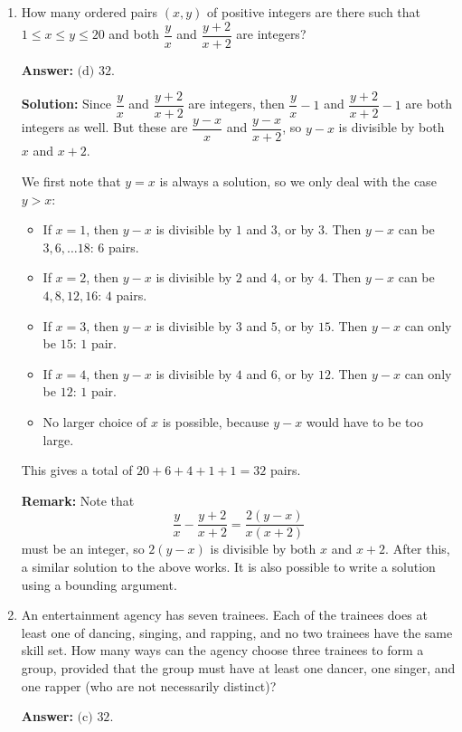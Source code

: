 \documentclass[11pt,paper=letter]{scrartcl}
\begin{document}
\begin{enumerate}[left=0pt]
\item How many ordered pairs $(x, y)$ of positive integers are there such that $1 \leq x \leq y \leq 20$ and both $\dfrac yx$ and $\dfrac{y+2}{x+2}$ are integers?


\textbf{Answer:} $\boxed{\text{(d) }32}$.

\textbf{Solution:} Since $\dfrac yx$ and $\dfrac{y+2}{x+2}$ are integers, then $\dfrac yx - 1$ and $\dfrac{y+2}{x+2} - 1$ are both integers as well. But these are $\dfrac{y-x}x$ and $\dfrac{y-x}{x+2}$, so $y-x$ is divisible by both $x$ and $x+2$.

We first note that $y = x$ is always a solution, so we only deal with the case $y > x$:
\begin{itemize}
  \item If $x = 1$, then $y-x$ is divisible by $1$ and $3$, or by $3$. Then $y-x$ can be $3, 6, \ldots 18$: $6$ pairs.
  \item If $x = 2$, then $y-x$ is divisible by $2$ and $4$, or by $4$. Then $y-x$ can be $4, 8, 12, 16$: $4$ pairs.
  \item If $x = 3$, then $y-x$ is divisible by $3$ and $5$, or by $15$. Then $y-x$ can only be $15$: $1$ pair.
  \item If $x = 4$, then $y-x$ is divisible by $4$ and $6$, or by $12$. Then $y-x$ can only be $12$: $1$ pair.
  \item No larger choice of $x$ is possible, because $y-x$ would have to be too large.
\end{itemize}
This gives a total of $20 + 6 + 4 + 1 + 1 = 32$ pairs.

\textbf{Remark:} Note that $$\dfrac yx - \dfrac{y+2}{x+2}= \dfrac{2(y-x)}{x(x+2)}$$ must be an integer, so $2(y-x)$ is divisible by both $x$ and $x+2$. After this, a similar solution to the above works. It is also possible to write a solution using a bounding argument. 

\item An entertainment agency has seven trainees. Each of the trainees does at least one of dancing, singing, and rapping, and no two trainees have the same skill set. How many ways can the agency choose three trainees to form a group, provided that the group must have at least one dancer, one singer, and one rapper (who are not necessarily distinct)?


\textbf{Answer:} $\boxed{\text{(c) }32}$.


\end{enumerate}
\end{document}
